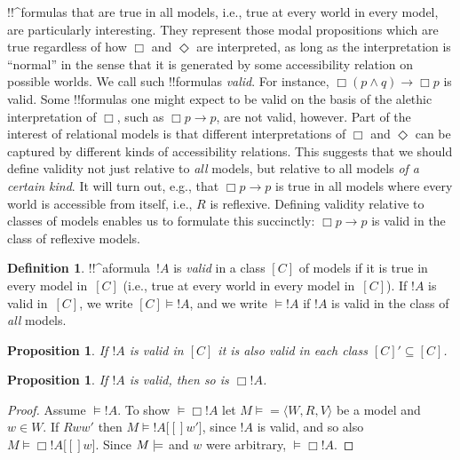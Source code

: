 \documentclass[10pt,a4paper]{article}
\theoremstyle{plain}
\newtheorem{prop}[thm]{Proposition}
\theoremstyle{definition}
\newtheorem{defn}[thm]{Definition}
\theoremstyle{remark}
\newenvironment{explain}{}{}
\newcommand*{\ollabel}[1]{\label{#1}}
\providecommand{\lif}{\mathbin{\rightarrow}}
\providecommand{\Entails}{\mathrel{\models}}
\providecommand{\mSat}[3]{\ensuremath{#1 \models #2[#3]}}
\providecommand{\mModel}[2]{\ensuremath{#1 \models #2}}
\providecommand{\tuple}[1]{\langle #1 \rangle}
\providecommand{\mClass}[1]{[#1]}
\begin{document}
\begin{explain}
  !!^{formula}s that are true in all models, i.e., true at every world
  in every model, are particularly interesting. They represent those
  modal propositions which are true regardless of how $\Box$ and
  $\Diamond$ are interpreted, as long as the interpretation is
  ``normal'' in the sense that it is generated by some accessibility
  relation on possible worlds. We call such !!{formula}s
  \emph{valid}. For instance, $\Box(p \land q) \lif \Box p$ is
  valid. Some !!{formula}s one might expect to be valid on the basis
  of the alethic interpretation of $\Box$, such as $\Box p \lif p$,
  are not valid, however.  Part of the interest of relational models
  is that different interpretations of $\Box$ and $\Diamond$ can be
  captured by different kinds of accessibility relations. This
  suggests that we should define validity not just relative to
  \emph{all} models, but relative to all models \emph{of a certain
    kind}. It will turn out, e.g., that $\Box p \lif p$ is true in all
  models where every world is accessible from itself, i.e., $R$ is
  reflexive. Defining validity relative to classes of models enables
  us to formulate this succinctly: $\Box p \lif p$ is valid in the
  class of reflexive models.
\end{explain}

\begin{defn}
  !!^a{formula}~$!A$ is \emph{valid} in a class $\mClass{C}$ of
  models if it is true in every model in~$\mClass{C}$ (i.e., true at
  every world in every model in~$\mClass{C}$). If $!A$ is valid
  in~$\mClass{C}$, we write $\mClass{C} \Entails !A$, and we
  write $\Entails !A$ if $!A$ is valid in the class of
  \emph{all} models.
\end{defn}

\begin{prop}\ollabel{prop:subset-class}
  If $!A$ is valid in $\mClass{C}$ it is also valid in each class
  $\mClass{C}' \subseteq \mClass{C}$.
\end{prop}

\begin{prop}\ollabel{prop:Nec-rule}
  If $!A$ is valid, then so is $\Box!A$. 
\end{prop}

\begin{proof}
  Assume $\Entails !A$. To show $\Entails \Box!A$ let $\mModel{M} =
  \tuple{W, R, V}$ be a model and $w \in W$. If $Rww'$ then
  $\mSat{M}{!A}[w']$, since $!A$ is valid, and so also
  $\mSat{M}{\Box!A}[w]$. Since $\mModel{M}$ and $w$ were
  arbitrary, $\Entails \Box!A$.
\end{proof}
\end{document}
